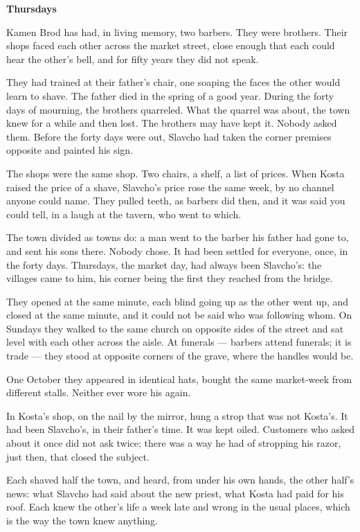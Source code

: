 \documentclass[11pt]{article}
\begin{document}
\begin{center}
{\LARGE\bfseries Thursdays}
\end{center}
\bigskip
\noindent Kamen Brod has had, in living memory, two barbers. They were brothers. Their shops faced each other across the market street, close enough that each could hear the other's bell, and for fifty years they did not speak.

They had trained at their father's chair, one soaping the faces the other would learn to shave. The father died in the spring of a good year. During the forty days of mourning, the brothers quarreled. What the quarrel was about, the town knew for a while and then lost. The brothers may have kept it. Nobody asked them. Before the forty days were out, Slavcho had taken the corner premises opposite and painted his sign.

The shops were the same shop. Two chairs, a shelf, a list of prices. When Kosta raised the price of a shave, Slavcho's price rose the same week, by no channel anyone could name. They pulled teeth, as barbers did then, and it was said you could tell, in a laugh at the tavern, who went to which.

The town divided as towns do: a man went to the barber his father had gone to, and sent his sons there. Nobody chose. It had been settled for everyone, once, in the forty days. Thursdays, the market day, had always been Slavcho's: the villages came to him, his corner being the first they reached from the bridge.

They opened at the same minute, each blind going up as the other went up, and closed at the same minute, and it could not be said who was following whom. On Sundays they walked to the same church on opposite sides of the street and sat level with each other across the aisle. At funerals — barbers attend funerals; it is trade — they stood at opposite corners of the grave, where the handles would be.

One October they appeared in identical hats, bought the same market-week from different stalls. Neither ever wore his again.

In Kosta's shop, on the nail by the mirror, hung a strop that was not Kosta's. It had been Slavcho's, in their father's time. It was kept oiled. Customers who asked about it once did not ask twice; there was a way he had of stropping his razor, just then, that closed the subject.

Each shaved half the town, and heard, from under his own hands, the other half's news: what Slavcho had said about the new priest, what Kosta had paid for his roof. Each knew the other's life a week late and wrong in the usual places, which is the way the town knew anything.
\end{document}
